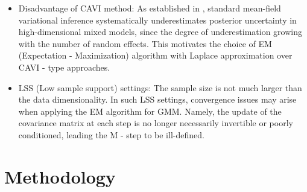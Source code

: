 \documentclass[]{report}
\theoremstyle{definition}
\begin{document}
    \begin{itemize}
    \item Disadvantage of CAVI method: As established in \cite{Goplerud_2024}, standard mean-field variational inference systematically underestimates posterior uncertainty in high-dimensional mixed models, since the degree of underestimation growing with the number of random effects. This motivates the choice of EM (Expectation - Maximization) algorithm with Laplace approximation over CAVI - type approaches.
    \item LSS (Low sample support) settings: The sample size is not much larger than the data dimensionality. In such LSS settings, convergence issues may arise when applying the EM algorithm for GMM. Namely, the update of the covariance matrix at each step is no longer necessarily invertible or poorly conditioned, leading the M - step to be ill-defined\cite{houdouin2023regularizedemalgorithm}.
        
    \end{itemize}
	\chapter{Methodology}
    \label{chap:methodology}
\end{document}
